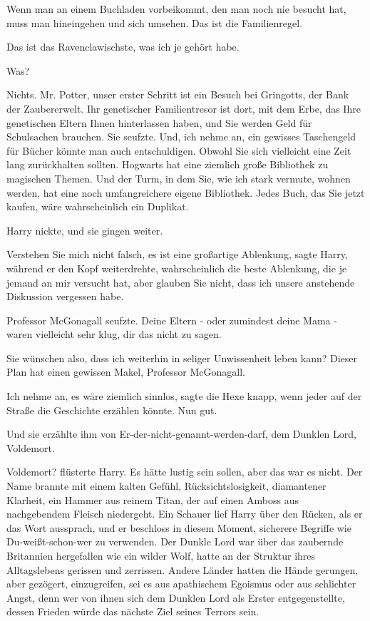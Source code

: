 \glqq{}Wenn man an einem Buchladen vorbeikommt, den man noch nie besucht hat,
muss man hineingehen und sich umsehen. Das ist die Familienregel.\grqq{}

\glqq{}Das ist das Ravenclawischste, was ich je gehört habe.\grqq{}

\glqq{}Was?\grqq{}

\glqq{}Nichts. Mr. Potter, unser erster Schritt ist ein Besuch bei Gringotts, der
Bank der Zaubererwelt. Ihr genetischer Familientresor ist dort, mit dem Erbe,
das Ihre genetischen Eltern Ihnen hinterlassen haben, und Sie werden Geld für
Schulsachen brauchen.\grqq{} Sie seufzte. \glqq{}Und, ich nehme an, ein gewisses
Taschengeld für Bücher könnte man auch entschuldigen. Obwohl Sie sich vielleicht
eine Zeit lang zurückhalten sollten. Hogwarts hat eine ziemlich große Bibliothek
zu magischen Themen. Und der Turm, in dem Sie, wie ich stark vermute, wohnen
werden, hat eine noch umfangreichere eigene Bibliothek. Jedes Buch, das Sie
jetzt kaufen, wäre wahrscheinlich ein Duplikat.\grqq{}

Harry nickte, und sie gingen weiter.

\glqq{}Verstehen Sie mich nicht falsch, es ist eine großartige Ablenkung\grqq{},
sagte Harry, während er den Kopf weiterdrehte, \glqq{}wahrscheinlich die beste
Ablenkung, die je jemand an mir versucht hat, aber glauben Sie nicht, dass ich
unsere anstehende Diskussion vergessen habe.\grqq{}

Professor McGonagall seufzte. \glqq{}Deine Eltern - oder zumindest deine Mama -
waren vielleicht sehr klug, dir das nicht zu sagen.\grqq{}

\glqq{}Sie wünschen also, dass ich weiterhin in seliger Unwissenheit leben kann?
Dieser Plan hat einen gewissen Makel, Professor McGonagall.\grqq{}

\glqq{}Ich nehme an, es wäre ziemlich sinnlos\grqq{}, sagte die Hexe knapp, \glqq{}
wenn jeder auf der Straße die Geschichte erzählen könnte. Nun gut.\grqq{}

Und sie erzählte ihm von Er-der-nicht-genannt-werden-darf, dem Dunklen Lord,
Voldemort.

\glqq{}Voldemort?\grqq{} flüsterte Harry. Es hätte lustig sein sollen, aber das
war es nicht. Der Name brannte mit einem kalten Gefühl, Rücksichtslosigkeit,
diamantener Klarheit, ein Hammer aus reinem Titan, der auf einen Amboss aus
nachgebendem Fleisch niedergeht. Ein Schauer lief Harry über den Rücken, als er
das Wort aussprach, und er beschloss in diesem Moment, sicherere Begriffe wie
Du-weißt-schon-wer zu verwenden. Der Dunkle Lord war über das zaubernde
Britannien hergefallen wie ein wilder Wolf, hatte an der Struktur ihres
Alltagslebens gerissen und zerrissen. Andere Länder hatten die Hände gerungen,
aber gezögert, einzugreifen, sei es aus apathischem Egoismus oder aus schlichter
Angst, denn wer von ihnen sich dem Dunklen Lord als Erster entgegenstellte,
dessen Frieden würde das nächste Ziel seines Terrors sein.

